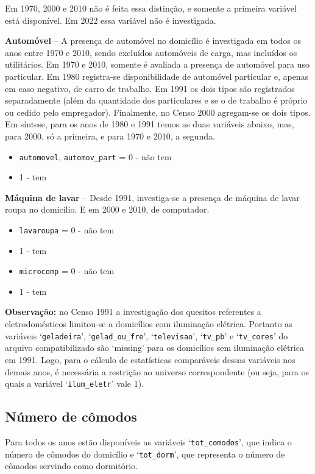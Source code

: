 \documentclass[12pt,a4paper]{article}
\newcommand{\vr}[1]{\texttt{#1}}
\begin{document}
Em 1970, 2000 e 2010 não é feita essa distinção, e somente a primeira variável está disponível. Em 2022 essa variável não é investigada.

\textbf{Automóvel} -- A presença de automóvel no domicílio é investigada em todos os anos entre 1970 e 2010, sendo excluídos automóveis de carga, mas incluídos os utilitários. Em 1970 e 2010, somente é avaliada a presença de automóvel para uso particular. Em 1980 registra-se disponibilidade de automóvel particular e, apenas em caso negativo, de carro de trabalho. Em 1991 os dois tipos são registrados separadamente (além da quantidade dos particulares e se o de trabalho é próprio ou cedido pelo empregador). Finalmente, no Censo 2000 agregam-se os dois tipos. Em síntese, para os anos de 1980 e 1991 temos as duas variáveis abaixo, mas, para 2000, só a primeira, e para 1970 e 2010, a segunda.
\begin{itemize}
  \item \vr{automovel}, \vr{automov\_part} = 0 - não tem
  \item 1 - tem
\end{itemize}

\textbf{Máquina de lavar} -- Desde 1991, investiga-se a presença de máquina de lavar roupa no domicílio. E em 2000 e 2010, de computador.
\begin{itemize}
  \item \vr{lavaroupa} = 0 - não tem
  \item 1 - tem
  \item \vr{microcomp} = 0 - não tem
  \item 1 - tem
\end{itemize}

\textbf{Observação:} no Censo 1991 a investigação dos quesitos referentes a eletrodomésticos limitou-se a domicílios com iluminação elétrica. Portanto as variáveis ‘\vr{geladeira}’, ‘\vr{gelad\_ou\_fre}’, ‘\vr{televisao}’, ‘\vr{tv\_pb}’ e ‘\vr{tv\_cores}’ do arquivo compatibilizado são ‘missing’ para os domicílios sem iluminação elétrica em 1991. Logo, para o cálculo de estatísticas comparáveis dessas variáveis nos demais anos, é necessária a restrição ao universo correspondente (ou seja, para os quais a variável ‘\vr{ilum\_eletr}’ vale 1).

\subsection{Número de cômodos}\label{sec:c12}
Para todos os anos estão disponíveis as variáveis ‘\vr{tot\_comodos}’, que indica o número de cômodos do domicílio e ‘\vr{tot\_dorm}’, que representa o número de cômodos servindo como dormitório.
\end{document}

